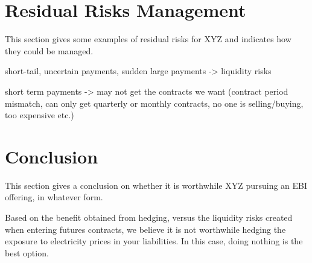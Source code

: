 \documentclass[12pt]{article}
\begin{document}
\section{Residual Risks Management}
\begin{flushleft}
This section gives some examples of residual risks for XYZ and indicates how they could be managed. \par
short-tail, uncertain payments, sudden large payments -> liquidity risks \par
short term payments -> may not get the contracts we want (contract period mismatch, can only get quarterly or monthly contracts, no one is selling/buying, too expensive etc.)\par
\end{flushleft}

\section{Conclusion}
\begin{flushleft}
This section gives a conclusion on whether it is worthwhile XYZ pursuing an EBI offering, in whatever form. 

Based on the benefit obtained from hedging, versus the liquidity risks created when
entering futures contracts, we believe it is not worthwhile hedging the exposure to electricity prices in your liabilities. In this case, doing nothing is the best option.
\end{flushleft}
\newpage

\printbibliography[heading=bibintoc]
\end{document}
